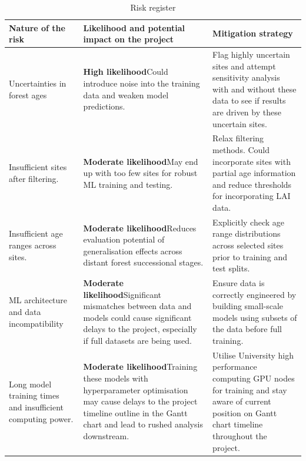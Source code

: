 \documentclass[paper=a4,fontsize=12pt]{scrartcl}
\begin{document}
\begin{table}[H]
	\centering
	\caption{Risk register}
	\label{tab:risk}
	\begin{tabularx}{\textwidth}{ X | X | X } 
		\hline\hline
		\textbf{Nature of the risk} & \textbf{Likelihood and potential impact on the project} & \textbf{Mitigation strategy} \\
		\hline
		 Uncertainties in forest ages & \textbf{High likelihood}\newline Could introduce noise into the training data and weaken model predictions. & Flag highly uncertain sites and attempt sensitivity analysis with and without these data to see if results are driven by these uncertain sites. \\
		\hline
		 Insufficient sites after filtering. & \textbf{Moderate likelihood}\newline May end up with too few sites for robust ML training and testing. & Relax filtering methods. Could incorporate sites with partial age information and reduce thresholds for incorporating LAI data. \\ 
		\hline
		 Insufficient age ranges across sites. & \textbf{Moderate likelihood}\newline Reduces evaluation potential of generalisation effects across distant forest successional stages. & Explicitly check age range distributions across selected sites prior to training and test splits. \\
		\hline
		 ML architecture and data incompatibility & \textbf{Moderate likelihood}\newline Significant mismatches between data and models could cause significant delays to the project, especially if full datasets are being used. & Ensure data is correctly engineered by building small-scale models using subsets of the data before full training.\\
		\hline
		 Long model training times and insufficient computing power. & \textbf{Moderate likelihood}\newline Training these models with hyperparameter optimisation may cause delays to the project timeline outline in the Gantt chart and lead to rushed analysis downstream. & Utilise University high performance computing GPU nodes for training and stay aware of current position on Gantt chart timeline throughout the project.\\
		\hline\hline
	\end{tabularx} 
\end{table}
\restoregeometry
\end{document}
